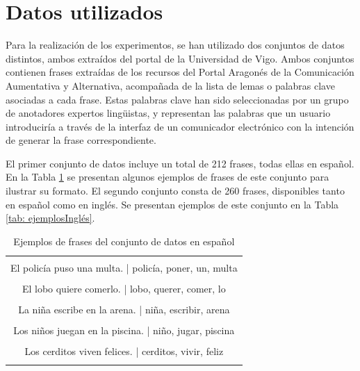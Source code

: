 \documentclass[11pt,spanish,listoffigures,listoftables]{tfgetsinf}
\begin{document}
\section{Datos utilizados}

Para la realización de los experimentos, se han utilizado dos conjuntos de datos distintos, ambos extraídos del portal de la Universidad de Vigo. Ambos conjuntos contienen frases extraídas de los recursos del Portal Aragonés de la Comunicación Aumentativa y Alternativa, acompañada de la lista de lemas o palabras clave asociadas a cada frase. Estas palabras clave han sido seleccionadas por un grupo de anotadores expertos lingüistas, y representan las palabras que un usuario introduciría a través de la interfaz de un comunicador electrónico con la intención de generar la frase correspondiente.

El primer conjunto de datos incluye un total de 212 frases, todas ellas en español. En la Tabla \ref{tab: ejemplosEspañol} se presentan algunos ejemplos de frases de este conjunto para ilustrar su formato. El segundo conjunto consta de 260 frases, disponibles tanto en español como en inglés. Se presentan ejemplos de este conjunto en la Tabla \ref{tab: ejemplosInglés}.

\begin{table}[!h]
\caption{Ejemplos de frases del conjunto de datos en español}
\begin{center}
\begin{tabular}{ | c | }
\hline
	\\
	El policía puso una multa. | policía, poner, un, multa \\
	\\
	El lobo quiere comerlo. | lobo, querer, comer, lo \\
	\\
	La niña escribe en la arena. | niña, escribir, arena \\
	\\
	Los niños juegan en la piscina. | niño, jugar, piscina \\
	\\
	Los cerditos viven felices. | cerditos, vivir, feliz \\
	\\
\hline
\end{tabular}
\end{center}
\label{tab: ejemplosEspañol}
\end{table}
\end{document}
